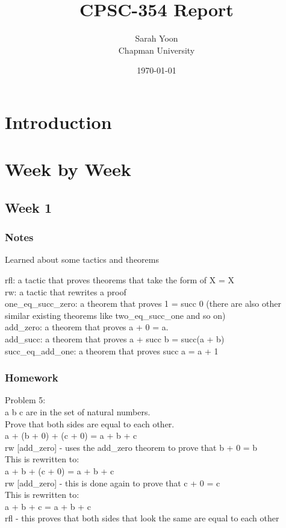 \documentclass{article}
\title{CPSC-354 Report}
\author{Sarah Yoon  \\ Chapman University}
\date{\today}
\theoremstyle{theorem}
\theoremstyle{definition}
\theoremstyle{remark}
\begin{document}
\maketitle

\begin{abstract}

\end{abstract}

\setcounter{tocdepth}{3}
\tableofcontents

\section{Introduction}\label{intro}

\section{Week by Week}\label{homework}

\subsection{Week 1}

\subsubsection*{Notes}
Learned about some tactics and theorems

rfl: a tactic that proves theorems that take the form of X = X \\
rw: a tactic that rewrites a proof\\
one\_eq\_succ\_zero: a theorem that proves 1 = succ 0 (there are also other similar existing theorems like two\_eq\_succ\_one and so on)\\
add\_zero: a theorem that proves a + 0 = a.\\
add\_succ: a theorem that proves a + succ b = succ(a + b)\\
succ\_eq\_add\_one: a theorem that proves succ a = a + 1\\

\subsubsection*{Homework}
Problem 5: \\
a b c are in the set of natural numbers. \\
Prove that both sides are equal to each other. \\
a + (b + 0) + (c + 0) = a + b + c \\
rw [add\_zero] - uses the add\_zero theorem to prove that b + 0 = b \\
This is rewritten to: \\
a + b + (c + 0) = a + b + c \\
rw [add\_zero] - this is done again to prove that c + 0 = c \\ 
This is rewritten to: \\
a + b + c = a + b + c \\
rfl - this proves that both sides that look the same are equal to each other \\
\end{document}
